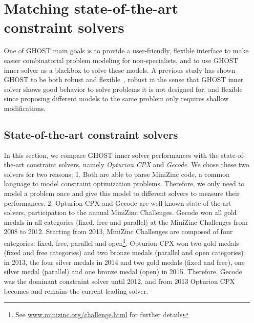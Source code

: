 \documentclass[journal]{IEEEtran}
\newcommand{\ghost}{\textsc{GHOST}\xspace}
\begin{document}
{\color{blue}
\section{Matching state-of-the-art constraint solvers}\label{sec:SOTA}

One  of \ghost  main goals  is  to provide  a user-friendly,  flexible
interface   to  make   easier  combinatorial   problem  modeling   for
non-specialists, and to use \ghost inner solver as a blackbox to solve
these models. A previous study has  shown \ghost to be both robust and
flexible~\cite{aiide15_rts},  robust in  the sense  that \ghost  inner
solver shows good  behavior to solve problems it is  not designed for,
and flexible since proposing different models to the same problem only
requires shallow modifications.

\subsection{State-of-the-art constraint solvers}

In this section, we compare  \ghost inner solver performances with the
state-of-the-art  constraint solvers,  namely {\it  Opturion CPX}  and
{\it Gecode}.  We chose these  two solvers  for two reasons:  1. Both
are able to parse MiniZinc code, a common language to model constraint
optimization problems. Therefore, we only need to model a problem once
and  give   this  model   to  different   solvers  to   measure  their
performances.   2.   Opturion   CPX   and  Gecode   are   well   known
state-of-the-art  solvers,   participation  to  the   annual  MiniZinc
Challenges.   Gecode won  all gold  medals in  all categories  (fixed,
free and parallel) at the
MiniZinc Challenges from  2008 to 2012.  Starting  from 2013, MiniZinc
Challenges are composed of four  categories: fixed, free, parallel and
open\footnote{See
  \href{http://www.minizinc.org/challenge.html}{www.minizinc.org/challenge.html}
  for further details}. Opturion CPX won two gold
medals (fixed  and free  categories) and  two bronze  medals (parallel
and open categories)  in 2013, the four silver medals  in 2014 and two
gold  medals (fixed  and free),  one silver  medal (parallel)  and one
bronze  medal  (open) in  2015.  Therefore,  Gecode was  the  dominant
constraint solver until  2012, and from 2013 Opturion  CPX becomes and
remains the current leading solver.

}
\end{document}
